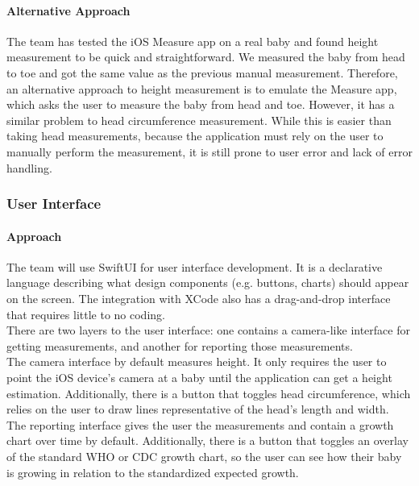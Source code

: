 \documentclass[onecolumn, draftclsnofoot,10pt, compsoc]{IEEEtran}
\begin{document}
\paragraph{Alternative Approach}

The team has tested the iOS Measure app on a real baby and found height measurement to be quick and straightforward. We measured the baby from head to toe and got the same value as the previous manual measurement. Therefore, an alternative approach to height measurement is to emulate the Measure app, which asks the user to measure the baby from head and toe. However, it has a similar problem to head circumference measurement. While this is easier than taking head measurements, because the application must rely on the user to manually perform the measurement, it is still prone to user error and lack of error handling.

\subsubsection{User Interface}

\paragraph{Approach}

The team will use SwiftUI for user interface development. It is a declarative language describing what design components (e.g. buttons, charts) should appear on the screen. The integration with XCode also has a drag-and-drop interface that requires little to no coding.\\

There are two layers to the user interface: one contains a camera-like interface for getting measurements, and another for reporting those measurements.\\

The camera interface by default measures height. It only requires the user to point the iOS device's camera at a baby until the application can get a height estimation. Additionally, there is a button that toggles head circumference, which relies on the user to draw lines representative of the head's length and width.\\

The reporting interface gives the user the measurements and contain a growth chart over time by default. Additionally, there is a button that toggles an overlay of the standard WHO or CDC growth chart, so the user can see how their baby is growing in relation to the standardized expected growth. 
\end{document}

